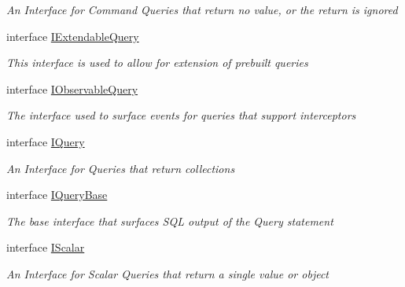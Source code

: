 \begin{DoxyCompactItemize}
\begin{DoxyCompactList}\small\item\em An Interface for Command Queries that return no value, or the return is ignored \end{DoxyCompactList}\item 
interface \hyperlink{interface_highway_1_1_data_1_1_interfaces_1_1_i_extendable_query}{I\-Extendable\-Query}
\begin{DoxyCompactList}\small\item\em This interface is used to allow for extension of prebuilt queries \end{DoxyCompactList}\item 
interface \hyperlink{interface_highway_1_1_data_1_1_interfaces_1_1_i_observable_query}{I\-Observable\-Query}
\begin{DoxyCompactList}\small\item\em The interface used to surface events for queries that support interceptors \end{DoxyCompactList}\item 
interface \hyperlink{interface_highway_1_1_data_1_1_interfaces_1_1_i_query-g}{I\-Query}
\begin{DoxyCompactList}\small\item\em An Interface for Queries that return collections \end{DoxyCompactList}\item 
interface \hyperlink{interface_highway_1_1_data_1_1_interfaces_1_1_i_query_base}{I\-Query\-Base}
\begin{DoxyCompactList}\small\item\em The base interface that surfaces S\-Q\-L output of the Query statement \end{DoxyCompactList}\item 
interface \hyperlink{interface_highway_1_1_data_1_1_interfaces_1_1_i_scalar-g}{I\-Scalar}
\begin{DoxyCompactList}\small\item\em An Interface for Scalar Queries that return a single value or object \end{DoxyCompactList}\end{DoxyCompactItemize}
